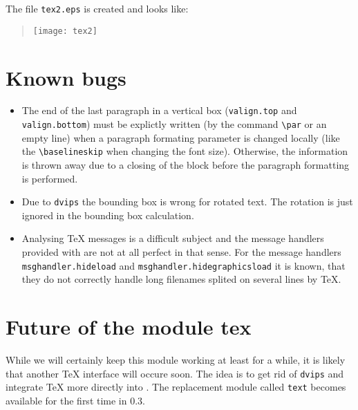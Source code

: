 The file \verb|tex2.eps| is created and looks like:
\begin{quote}
\texttt{[image: tex2]}
\end{quote}

\section{Known bugs}
\begin{itemize}
\item The end of the last paragraph in a vertical box
(\verb|valign.top| and \verb|valign.bottom|) must be explictly
written (by the command \verb|\par| or an empty line) when a paragraph
formating parameter is changed locally (like the \verb|\baselineskip|
when changing the font size).  Otherwise, the information is thrown
away due to a closing of the block before the paragraph formatting is
performed.
\item Due to \verb|dvips| the bounding box is wrong for rotated text.
The rotation is just ignored in the bounding box calculation.
\item Analysing \TeX{} messages is a difficult subject and the message
handlers provided with \PyX{} are not at all perfect in that sense.
For the message handlers \verb|msghandler.hideload| and
\verb|msghandler.hidegraphicsload| it is known, that they do not
correctly handle long filenames splited on several lines by \TeX.
\end{itemize}

\section{Future of the module tex}
While we will certainly keep this module working at least for a while,
it is likely that another \TeX{} interface will occure soon. The idea
is to get rid of \verb|dvips| and integrate \TeX{} more directly into
\PyX. The replacement module called \verb|text| becomes available for
the first time in \PyX{} 0.3.


